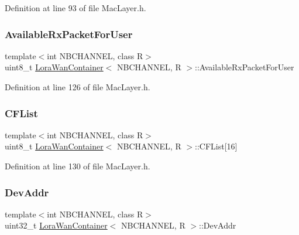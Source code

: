 Definition at line 93 of file Mac\+Layer.\+h.

\mbox{\label{class_lora_wan_container_a736200328d8ff1538edfed3293e02ca9}} 
\subsubsection{\texorpdfstring{Available\+Rx\+Packet\+For\+User}{AvailableRxPacketForUser}}
{\footnotesize\ttfamily template$<$int N\+B\+C\+H\+A\+N\+N\+EL, class R$>$ \\
uint8\+\_\+t \mbox{\hyperlink{class_lora_wan_container}{Lora\+Wan\+Container}}$<$ N\+B\+C\+H\+A\+N\+N\+EL, R $>$\+::Available\+Rx\+Packet\+For\+User}



Definition at line 126 of file Mac\+Layer.\+h.

\mbox{\label{class_lora_wan_container_ad1d51b822467332f07b94fcb17189ced}} 
\subsubsection{\texorpdfstring{C\+F\+List}{CFList}}
{\footnotesize\ttfamily template$<$int N\+B\+C\+H\+A\+N\+N\+EL, class R$>$ \\
uint8\+\_\+t \mbox{\hyperlink{class_lora_wan_container}{Lora\+Wan\+Container}}$<$ N\+B\+C\+H\+A\+N\+N\+EL, R $>$\+::C\+F\+List\mbox{[}16\mbox{]}}



Definition at line 130 of file Mac\+Layer.\+h.

\mbox{\label{class_lora_wan_container_aae352b955ec64652c64084de67d6309f}} 
\subsubsection{\texorpdfstring{Dev\+Addr}{DevAddr}}
{\footnotesize\ttfamily template$<$int N\+B\+C\+H\+A\+N\+N\+EL, class R$>$ \\
uint32\+\_\+t \mbox{\hyperlink{class_lora_wan_container}{Lora\+Wan\+Container}}$<$ N\+B\+C\+H\+A\+N\+N\+EL, R $>$\+::Dev\+Addr}



